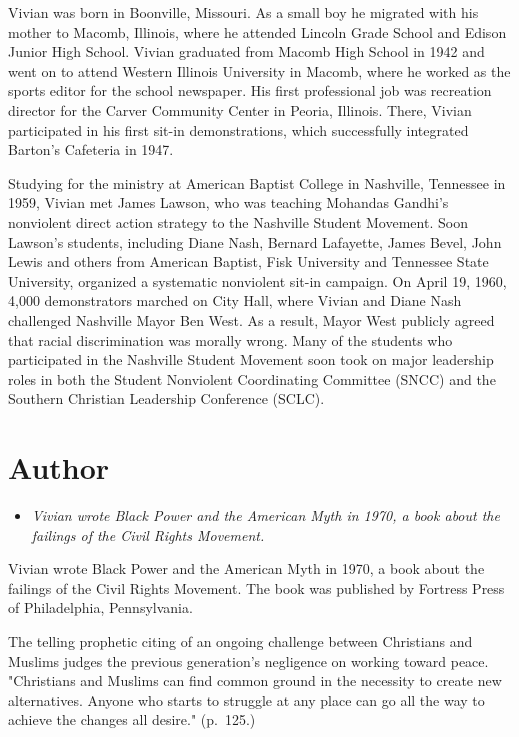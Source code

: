 Vivian was born in Boonville, Missouri. As a small boy he migrated with
his mother to Macomb, Illinois, where he attended Lincoln Grade School
and Edison Junior High School. Vivian graduated from Macomb High School
in 1942 and went on to attend Western Illinois University in Macomb,
where he worked as the sports editor for the school newspaper. His first
professional job was recreation director for the Carver Community Center
in Peoria, Illinois. There, Vivian participated in his first sit-in
demonstrations, which successfully integrated Barton's Cafeteria in
1947.

Studying for the ministry at American Baptist College in Nashville,
Tennessee in 1959, Vivian met James Lawson, who was teaching Mohandas
Gandhi's nonviolent direct action strategy to the Nashville Student
Movement. Soon Lawson's students, including Diane Nash, Bernard
Lafayette, James Bevel, John Lewis and others from American Baptist,
Fisk University and Tennessee State University, organized a systematic
nonviolent sit-in campaign. On April 19, 1960, 4,000 demonstrators
marched on City Hall, where Vivian and Diane Nash challenged Nashville
Mayor Ben West. As a result, Mayor West publicly agreed that racial
discrimination was morally wrong. Many of the students who participated
in the Nashville Student Movement soon took on major leadership roles in
both the Student Nonviolent Coordinating Committee (SNCC) and the
Southern Christian Leadership Conference (SCLC).

\section{Author}\label{author}

\begin{itemize}
\item
  \emph{Vivian wrote Black Power and the American Myth in 1970, a book
  about the failings of the Civil Rights Movement.}
\end{itemize}

Vivian wrote Black Power and the American Myth in 1970, a book about the
failings of the Civil Rights Movement. The book was published by
Fortress Press of Philadelphia, Pennsylvania.

The telling prophetic citing of an ongoing challenge between Christians
and Muslims judges the previous generation's negligence on working
toward peace. "Christians and Muslims can find common ground in the
necessity to create new alternatives. Anyone who starts to struggle at
any place can go all the way to achieve the changes all desire."
(p.~125.)

